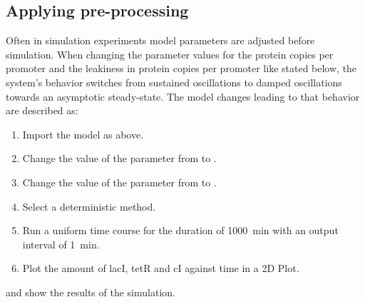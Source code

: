 \subsection{Applying pre-processing}
\label{sec:preprocessing}
Often in simulation experiments model parameters are adjusted before simulation. When changing the parameter values for the protein copies per promoter  and the leakiness in protein copies per promoter  like stated below, the system's behavior switches from sustained oscillations to damped oscillations towards an asymptotic steady-state. The model changes leading to that behavior are described as: 

\begin{enumerate}
	\item{Import the model as above.}
	\item{Change the value of the parameter  from  to .}
	\item{Change the value of the parameter  from  to .}
	\item{Select a deterministic method.}
	\item{Run a uniform time course for the duration of 1000~min with an output interval of 1~min.}
	\item Plot the amount of lacI, tetR and cI against time in a 2D Plot.
\end{enumerate}

 and  show the results of the simulation.

